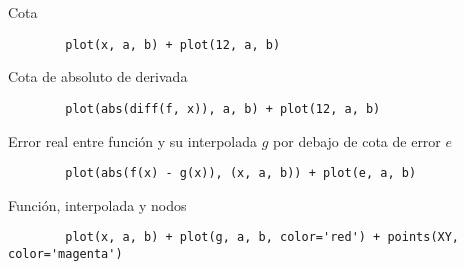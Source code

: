 \documentclass{article}
\begin{document}
	Cota
	
	\begin{verbatim}
		plot(x, a, b) + plot(12, a, b)
	\end{verbatim}

	Cota de absoluto de derivada

	\begin{verbatim}
		plot(abs(diff(f, x)), a, b) + plot(12, a, b)
	\end{verbatim}

	Error real entre función y su interpolada $g$ por debajo de cota de error $e$
	
	\begin{verbatim}
		plot(abs(f(x) - g(x)), (x, a, b)) + plot(e, a, b)
	\end{verbatim}

	Función, interpolada y nodos
	
	\begin{verbatim}
		plot(x, a, b) + plot(g, a, b, color='red') + points(XY, color='magenta')
	\end{verbatim}
\end{document}
